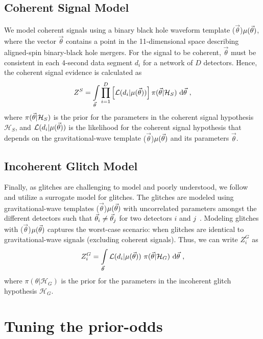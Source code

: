\documentclass[
 nofootinbib,
 amsmath,amssymb,
 aps,
 twocolumn,
 superscriptaddress
]{revtex4-2}
\newcommand{\mathcmd}[1]{{\sc \relax\ifmmode#1\else $#1$\fi}\xspace}
\newcommand{\parameters}{\mathcmd{\vec{\theta}}}
\newcommand{\template}{\mathcmd{\mu(\parameters)}}
\begin{document}
\subsection{Coherent Signal Model}
We model coherent signals using a binary black hole waveform template \template, where the vector \parameters contains a point in the 11-dimensional space describing aligned-spin binary-black hole mergers. For the signal to be coherent, \parameters must be consistent in each 4-second data segment $d_i$ for a network of $D$ detectors. Hence, the coherent signal evidence is calculated as
\begin{equation}
\label{eq:zs}
Z^S = \int\limits_{\parameters} \prod\limits^{D}_{i=1} \left[ \mathcal{L}(d_i|\template)\right] \pi(\parameters | \mathcal{H}_S)\  \text{d}\parameters \ ,
\end{equation}
where $\pi(\parameters| \mathcal{H}_S)$ is the prior for the parameters in the coherent signal hypothesis $\mathcal{H}_S$, and $\mathcal{L}(d_i|\template)$ is the likelihood for the coherent signal hypothesis that depends on the gravitational-wave template \template and its parameters \parameters. 

\subsection{Incoherent Glitch Model}
Finally, as glitches are challenging to model and poorly understood, we follow \citet{bci} and utilize a surrogate model for glitches. The glitches are modeled using gravitational-wave templates  \template with uncorrelated parameters amongst the different detectors such that  $\parameters_i \neq \parameters_j$ for two detectors $i$ and $j$~\cite{bci}.  Modeling glitches with \template captures the worst-case scenario: when glitches are identical to gravitational-wave signals (excluding coherent signals). Thus, we can write $Z^G_i$ as 
\begin{equation}
\label{eq:zg}
Z^G_i = \int\limits_{\parameters} \mathcal{L}(d_i|\template)\ \pi(\parameters| \mathcal{H}_G)\  \text{d}\parameters  \ ,
\end{equation}
where $\pi(\theta| \mathcal{H}_G)$ is the prior for the parameters in the incoherent glitch hypothesis $\mathcal{H}_G$. 



\section{Tuning the prior-odds}\label{apdx:tuning-prior-odds}
\end{document}

